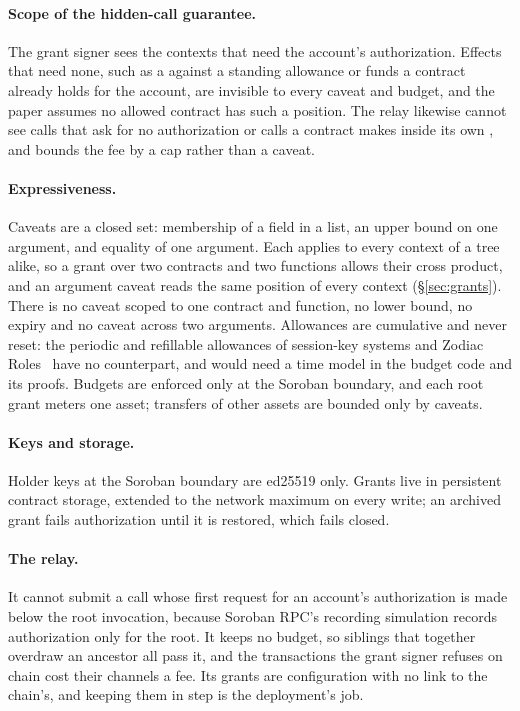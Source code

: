 \paragraph{Scope of the hidden-call guarantee.} The grant signer sees the
contexts that need the account's authorization. Effects that need none, such
as a  against a standing allowance or funds a contract
already holds for the account, are invisible to every caveat and budget, and
the paper assumes no allowed contract has such a
position. The relay likewise cannot see calls
that ask for no authorization or calls a contract makes inside its own
, and bounds the fee by a cap rather than a caveat.

\paragraph{Expressiveness.} Caveats are a closed set: membership of a field
in a list, an upper bound on one  argument, and equality of one
argument. Each applies to every context of a tree alike, so a grant over two
contracts and two functions allows their cross product, and an argument
caveat reads the same position of every context (\S\ref{sec:grants}). There
is no caveat scoped to one contract and function, no lower bound, no expiry
and no caveat across two arguments. Allowances are cumulative and never reset:
the periodic and refillable allowances of session-key systems and Zodiac
Roles~\cite{zodiacRoles,smartSessions} have no counterpart, and would need a
time model in the budget code and its proofs. Budgets are enforced only at the
Soroban boundary, and each root grant meters one asset; transfers of other
assets are bounded only by caveats.

\paragraph{Keys and storage.} Holder keys at the Soroban boundary are ed25519
only. Grants live in persistent contract storage, extended to the network
maximum on every write; an archived grant fails authorization until it is
restored, which fails closed.

\paragraph{The relay.} It cannot submit a call whose first request for an
account's authorization is made below the root invocation, because Soroban
RPC's recording simulation records authorization only for the
root. It keeps no budget, so siblings that
together overdraw an ancestor all pass it, and the transactions the grant
signer refuses on chain cost their channels a fee. Its
grants are configuration with no link to the chain's, and keeping them in step
is the deployment's job.

